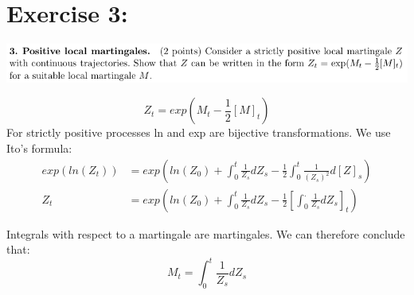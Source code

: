 \documentclass[document.tex]{subfiles}
\begin{document}
\section*{Exercise 3:}

\includegraphics[width=\textwidth]{ex3.png}

\begin{equation*}
Z_t = exp(M_t - \frac{1}{2} [M]_t)
\end{equation*}
For strictly positive processes ln and exp are bijective transformations. We use Ito's formula:
\begin{align*}
exp(ln(Z_t)) &= exp(ln(Z_0) + \int_0^t \frac{1}{Z_s} d Z_s - \frac{1}{2} \int_0^t \frac{1}{(Z_s)^2} d[Z]_s)\\
Z_t &= exp(ln(Z_0) + \int_0^t \frac{1}{Z_s} d Z_s - \frac{1}{2} [\int_0^. \frac{1}{Z_s} d Z_s]_t)
\end{align*}

Integrals with respect to a martingale are martingales. We can therefore conclude that:
\begin{equation*}
M_t = \int_0^t \frac{1}{Z_s} d Z_s
\end{equation*}



\end{document}

